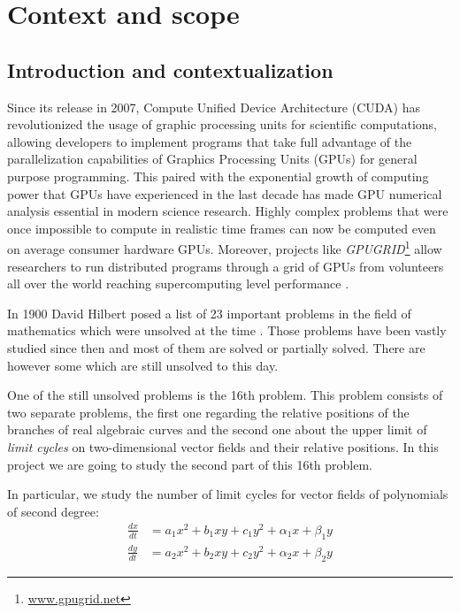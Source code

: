 
\section{Context and scope}%
\label{sec:context}

\subsection{Introduction and contextualization}%
\label{sub:intro}

Since its release in 2007, Compute Unified Device Architecture (CUDA) has
revolutionized the usage of graphic processing units for scientific
computations, allowing developers to implement programs that take full advantage
of the parallelization capabilities of Graphics Processing Units (GPUs) for
general purpose programming. This paired with the exponential growth of
computing power that GPUs have experienced in the last decade has made GPU
numerical analysis essential in modern science research. Highly complex problems
that were once impossible to compute in realistic time frames can now be
computed even on average consumer hardware GPUs. Moreover, projects like
\emph{GPUGRID}\footnote{\url{www.gpugrid.net}} allow researchers to run
distributed programs through a grid of GPUs from volunteers all over the world
reaching supercomputing level performance \cite{antaviana_nvidia_2008}.

In 1900 David Hilbert posed a list of 23 important problems in the field of mathematics
which were unsolved at the time
\cite{hilbert_mathematische_1900,hilbert_mathematical_1902}. Those
problems have been vastly studied since then and most of them are solved or
partially solved. There are however some which are still unsolved to this day.

One of the still unsolved problems is the 16th problem. This problem consists of
two separate problems, the first one regarding the relative positions of the
branches of real algebraic curves and the second one about the upper limit of
{\em limit cycles} on two-dimensional vector fields and their relative positions. In
this project we are going to study the second part of this 16th problem.

In particular, we study the number of limit cycles for vector fields of
polynomials of second degree:
\begin{align}\label{eq:system}
    \frac{dx}{dt} &= a_1x^2 + b_1xy + c_1y^2 + \alpha_1x + \beta_1y \nonumber \\
    \frac{dy}{dt} &= a_2x^2 + b_2xy + c_2y^2 + \alpha_2x + \beta_2y
\end{align}

